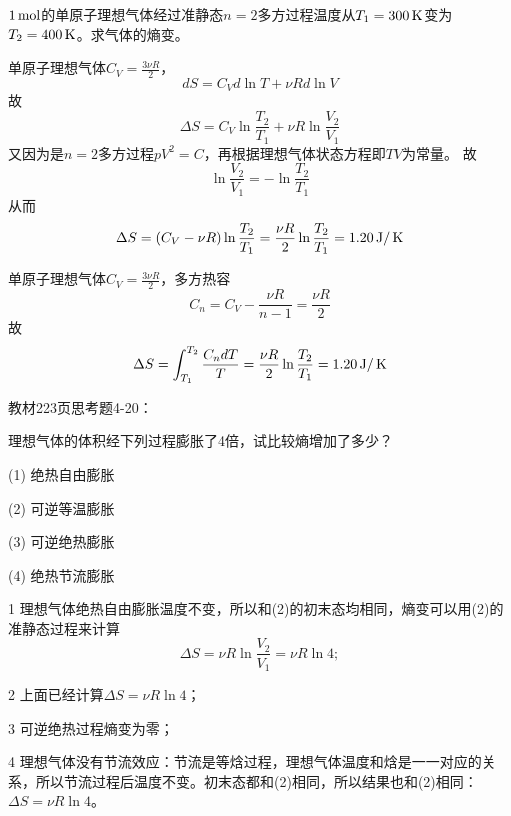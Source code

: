 \documentclass[CJK]{beamer}
\begin{document}
\begin{frame}
  \chtitle{\proid (\stwo)}
  \bch
  $1\,\mathrm{mol}$的单原子理想气体经过准静态$n=2$多方过程温度从$T_1=300\,\mathrm{K}$变为$T_2 = 400\,\mathrm{K}$。求气体的熵变。
  \ech
\end{frame}


\begin{frame}
  \bch
  单原子理想气体$C_V=\frac{3\nu R}{2}$，
  $$dS = C_V d\ln T + \nu R d\ln V$$
  故
  $$\Delta S = C_V\ln\frac{T_2}{T_1} + \nu R\ln\frac{V_2}{V_1}$$
  又因为是$n=2$多方过程$pV^2 = C$，再根据理想气体状态方程即$TV$为常量。
  故$$\ln\frac{V_2}{V_1} = - \ln\frac{T_2}{T_1}$$
  从而
  $$\Delta S = (C_V-\nu R)\ln\frac{T_2}{T_1} = \frac{\nu R}{2}\ln\frac{T_2}{T_1} = 1.20\,\mathrm{J}/\,\mathrm{K}$$
  \ech
\end{frame}


\begin{frame}
  \bch
  单原子理想气体$C_V=\frac{3\nu R}{2}$，多方热容
  $$C_n = C_V - \frac{\nu R}{n-1} = \frac{\nu R}{2}$$
  故
  $$\Delta S = \int_{T_1}^{T_2} \frac{C_n dT}{T} = \frac{\nu R}{2} \ln\frac{T_2}{T_1} = 1.20\,\mathrm{J}/\,\mathrm{K}$$
  \ech
\end{frame}


\begin{frame}
  \chtitle{\proid (\stwo)}
  \bch
  教材223页思考题4-20：

  理想气体的体积经下列过程膨胀了4倍，试比较熵增加了多少？
  \bitem
\item[(1)]{绝热自由膨胀}
\item[(2)]{可逆等温膨胀}
\item[(3)]{可逆绝热膨胀}
\item[(4)]{绝热节流膨胀}  
  \eitem
  \ech
\end{frame}


\begin{frame}
  \bch
  \bitem
\item[1]{理想气体绝热自由膨胀温度不变，所以和(2)的初末态均相同，熵变可以用(2)的准静态过程来计算
  $$\Delta S = \nu R \ln\frac{V_2}{V_1} = \nu R \ln 4;$$}
\item[2]{上面已经计算$\Delta S = \nu R \ln 4$；}
\item[3]{可逆绝热过程熵变为零；}
\item[4]{理想气体没有节流效应：节流是等焓过程，理想气体温度和焓是一一对应的关系，所以节流过程后温度不变。初末态都和(2)相同，所以结果也和(2)相同：$\Delta S = \nu R \ln 4$。}
  \eitem
  \ech
\end{frame}
\end{document}
